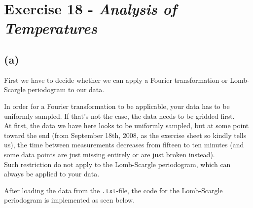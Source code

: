 \section*{Exercise 18 - \textit{Analysis of Temperatures}}

\subsection*{(a)}

First we have to decide whether we can apply a Fourier transformation or Lomb-Scargle periodogram to our data.

In order for a Fourier transformation to be applicable, your data has to be uniformly sampled. If that's not the case, the data needs to be gridded
first. \\

At first, the data we have here looks to be uniformly sampled, but at some point toward the end (from September 18th, 2008, as the exercise sheet so kindly tells us),
the time between measurements decreases from fifteen to ten minutes
(and some data points are just missing entirely or are just broken instead). \\

Such restriction do not apply to the Lomb-Scargle periodogram, which can always be applied to your data.

After loading the data from the \texttt{.txt}-file, the code for the Lomb-Scargle periodogram is implemented as seen below.

\begin{lstlisting}[language = Python, caption={Implementation of the Lomb-Scagle periodogram}, label = {list:lombscargle}]

\end{lstlisting}

